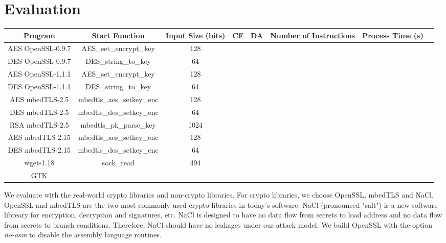 \section{Evaluation}
\label{res_overview}
\begin{table*}[]
    \begin{tabular}{c c c c c c c l}
    \hline
    Program                & Start Function             & Input Size (bits)   & CF   & DA     & Number of Instructions & Process Time (s) \\ \hline
    AES OpenSSL-0.9.7      & AES\_set\_encrypt\_key     &     128             &      &        &                        &                  \\
    DES OpenSSL-0.9.7      & DES\_string\_to\_key       &     64              &      &        &                        &                  \\
    AES OpenSSL-1.1.1      & AES\_set\_encrypt\_key     &     128             &      &        &                        &                  \\
    DES OpenSSL-1.1.1      & DES\_string\_to\_key       &     64              &      &        &                        &                  \\
    AES mbedTLS-2.5        & mbedtls\_aes\_setkey\_enc	&     128             &      &        &                        &                  \\
    DES mbedTLS-2.5        & mbedtls\_des\_setkey\_enc  &     64              &      &        &                        &                  \\
    RSA mbedTLS-2.5        & mbedtls\_pk\_parse\_key    &     1024            &      &        &                        &                  \\
    AES mbedTLS-2.15       & mbedtls\_aes\_setkey\_enc  &     128             &      &        &                        &                  \\
    DES mbedTLS-2.15       & mbedtls\_des\_setkey\_enc  &     64              &      &        &                        &                  \\
    wget-1.18              & sock\_read                 &     494             &      &        &                        &                  \\
    GTK                    &                            &                     &      &        &                        &                  \\
    \hline
    \end{tabular}
\end{table*}
We evaluate \tool{} with the real-world crypto libraries and non-crypto libraries. 
For crypto libraries, we choose OpenSSL, mbedTLS and NaCl. 
OpenSSL and mbedTLS are the two most commonly used
crypto libraries in today's software. NaCl (pronounced "salt") is a 
new software libreary for encryption, decryption and signatures, etc.
NaCl is designed to have no data flow from secrets to load address and no data 
flow from secrets to branch conditions. Therefore, NaCl should have no leakages
under our attack model. We build OpenSSL with the option \textit{no-asm} 
to disable the assembly language routines. 

